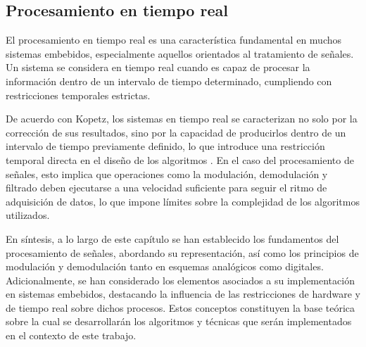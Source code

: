 \subsection{Procesamiento en tiempo real}

El procesamiento en tiempo real es una característica fundamental en muchos sistemas embebidos, especialmente aquellos orientados al tratamiento de señales. Un sistema se considera en tiempo real cuando es capaz de procesar la información dentro de un intervalo de tiempo determinado, cumpliendo con restricciones temporales estrictas.

De acuerdo con Kopetz, los sistemas en tiempo real se caracterizan no solo por la corrección de sus resultados, sino por la capacidad de producirlos dentro de un intervalo de tiempo previamente definido, lo que introduce una restricción temporal directa en el diseño de los algoritmos \cite{kopetz2011real}. En el caso del procesamiento de señales, esto implica que operaciones como la modulación, demodulación y filtrado deben ejecutarse a una velocidad suficiente para seguir el ritmo de adquisición de datos, lo que impone límites sobre la complejidad de los algoritmos utilizados.


En síntesis, a lo largo de este capítulo se han establecido los fundamentos del procesamiento de señales, abordando su representación, así como los principios de modulación y demodulación tanto en esquemas analógicos como digitales. Adicionalmente, se han considerado los elementos asociados a su implementación en sistemas embebidos, destacando la influencia de las restricciones de hardware y de tiempo real sobre dichos procesos. Estos conceptos constituyen la base teórica sobre la cual se desarrollarán los algoritmos y técnicas que serán implementados en el contexto de este trabajo.